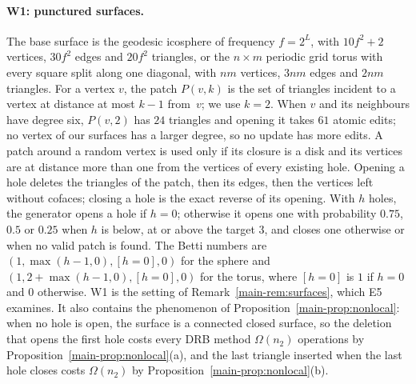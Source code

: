 \paragraph{W1: punctured surfaces.}
The base surface is the geodesic icosphere of frequency $f=2^L$, with $10f^2+2$
vertices, $30f^2$ edges and $20f^2$ triangles, or the $n\times m$ periodic grid
torus with every square split along one diagonal, with $nm$ vertices, $3nm$
edges and $2nm$ triangles. For a vertex $v$, the patch $P(v,k)$ is the set of
triangles incident to a vertex at distance at most $k-1$ from~$v$; we use $k=2$.
When $v$ and its neighbours have degree six, $P(v,2)$ has $24$ triangles and
opening it takes $61$ atomic edits; no vertex of our surfaces has a larger
degree, so no update has more edits. A patch around a
random vertex is used only if its closure is a disk and its vertices are at
distance more than one from the vertices of every existing hole. Opening a hole
deletes the triangles of the patch, then its edges, then the vertices left
without cofaces; closing a hole is the exact reverse of its opening. With $h$
holes, the generator opens a hole if $h=0$; otherwise it opens one with
probability $0.75$, $0.5$ or $0.25$ when $h$ is below, at or above the target
$3$, and closes one otherwise or when no valid patch is found. The Betti numbers
are $(1,\max(h-1,0),[h=0],0)$ for the sphere and $(1,2+\max(h-1,0),[h=0],0)$ for
the torus, where $[h=0]$ is $1$ if $h=0$ and $0$ otherwise.
W1 is the setting of Remark~\ref{main-rem:surfaces}, which E5 examines. It also contains
the phenomenon of Proposition~\ref{main-prop:nonlocal}: when no hole is open, the surface is a
connected closed surface, so the deletion that opens the first hole costs every
DRB method $\Omega(n_2)$ operations by Proposition~\ref{main-prop:nonlocal}(a), and the last
triangle inserted when the last hole closes costs $\Omega(n_2)$ by
Proposition~\ref{main-prop:nonlocal}(b).

